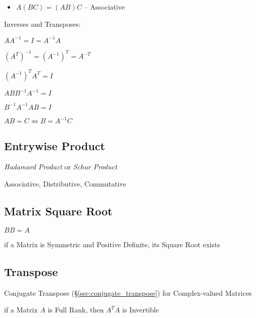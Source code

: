 \begin{itemize}
  \item $A(BC) = (AB)C$ -- Associative
\end{itemize}

Inverses and Transposes:

$AA^{-1} = I = A^{-1}A$

$(A^T)^{-1} = (A^{-1})^T = A^{-T}$

$(A^{-1})^T A^T = I$

$ABB^{-1}A^{-1} = I$

$B^{-1}A^{-1}AB = I$

$AB = C \Leftrightarrow B = A^{-1}C$



\subsection{Entrywise Product}\label{sec:entrywise_product}

\emph{Hadamard Product} or \emph{Schur Product}

Associative, Distributive, Commutative



\subsection{Matrix Square Root}\label{sec:matrix_square_root}

$BB = A$

if a Matrix is Symmetric and Positive Definite, its Square Root exists



\subsection{Transpose}\label{sec:transpose}

Conjugate Transpose (\S\ref{sec:conjugate_transpose}) for Complex-valued
Matrices

if a Matrix $A$ is Full Rank, then $A^TA$ is Invertible

